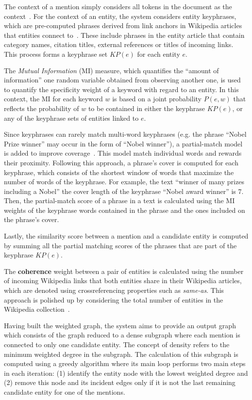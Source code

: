 The context of a mention simply considers all tokens in the document as the 
context~\cite{infExtr:ThaterFP10}. For the context of an entity, the system considers entity 
keyphrases, which are pre-computed phrases derived from link anchors in Wikipedia articles that 
entities connect to~\cite{infExtr:ThaterFP10}. These include phrases in the entity article that 
contain category names, citation titles, external references or titles of incoming links. This 
process forms a keyphrase set $KP(e)$ for each entity $e$. 

The \textit{Mutual Information} (MI) measure, which quantifies the ``amount of information'' one 
random variable obtained from observing another one, is used to quantify the specificity weight 
of a keyword with regard to an entity. In this context, the MI for each keyword $w$ is based on 
a joint probability $P(e, w)$ that reflects the probability of $w$ to be contained in either the 
keyphrase $KP(e)$, or any of the keyphrase sets of entities linked to $e$. 

Since keyphrases can rarely match multi-word keyphrases (e.g. the phrase ``Nobel Prize winner'' 
may occur in the form of ``Nobel winner''), a partial-match model is added to 
improve coverage~\cite{infExtr:taneva2011}. This model match individual words and rewards their
proximity. Following this approach, a phrase's cover is computed for each keyphrase, which 
consists of the shortest window of words that maximize the number of words of the keyphrase. 
For example, the text ``winner of many prizes including a Nobel'' the cover length of the 
keyphrase ``Nobel award winner'' is 7. Then, the partial-match score of a phrase in a text is
calculated using the MI weights of the keyphrase words contained in the phrase and the ones
included on the phrase's cover.

Lastly, the similarity score between a mention and a candidate entity is computed by summing all 
the partial matching scores of the phrases that are part of the keyphrase $KP(e)$.

The \textbf{coherence} weight between a pair of entities is calculated using the number of 
incoming Wikipedia links that both entities share in their Wikipedia articles, which are denoted 
using crossreferencing properties such as \textit{same-as}. This approach is polished up by 
considering the total number of entities in the Wikipedia collection~\cite{infExtr:MilneW08}.

Having built the weighted graph, the system aims to provide an output graph which consists of 
the graph reduced to a dense subgraph where each mention is connected to only one candidate 
entity. The concept of density refers to the minimum weighted degree in the subgraph. The 
calculation of this subgraph is computed using a greedy algorithm where its main loop performs 
two main steps in each iteration: (1) identify the entity node with the lowest weighted degree 
and (2) remove this node and its incident edges only if it is not the last remaining candidate 
entity for one of the mentions. 

